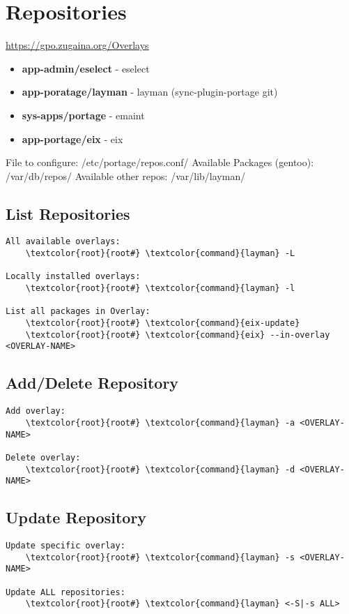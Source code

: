 \documentclass[10pt, a4paper, onecolumn, openany]{book}         %
\begin{document}
\section{Repositories}
\underline{\url{https://gpo.zugaina.org/Overlays}}\newline
\begin{itemize}
    \item \textbf{app-admin/eselect} - eselect
    \item \textbf{app-poratage/layman} - layman (sync-plugin-portage git)
    \item \textbf{sys-apps/portage} - emaint
    \item \textbf{app-portage/eix} - eix
\end{itemize}
File to configure: \textcolor{dir}{/etc/portage/repos.conf/}\newline
Available Packages (gentoo): \textcolor{dir}{/var/db/repos/}\newline
Available other repos: \textcolor{dir}{/var/lib/layman/}

\subsection{List Repositories}
\begin{Verbatim}[commandchars=\\\{\}]
All available overlays:
    \textcolor{root}{root#} \textcolor{command}{layman} -L
    
Locally installed overlays:
    \textcolor{root}{root#} \textcolor{command}{layman} -l
    
List all packages in Overlay:
    \textcolor{root}{root#} \textcolor{command}{eix-update}
    \textcolor{root}{root#} \textcolor{command}{eix} --in-overlay <OVERLAY-NAME>
\end{Verbatim}

\subsection{Add/Delete Repository}
\begin{Verbatim}[commandchars=\\\{\}]
Add overlay:
    \textcolor{root}{root#} \textcolor{command}{layman} -a <OVERLAY-NAME>
    
Delete overlay:
    \textcolor{root}{root#} \textcolor{command}{layman} -d <OVERLAY-NAME>
\end{Verbatim}

\subsection{Update Repository}
\begin{Verbatim}[commandchars=\\\{\}]
Update specific overlay:
    \textcolor{root}{root#} \textcolor{command}{layman} -s <OVERLAY-NAME>
    
Update ALL repositories:
    \textcolor{root}{root#} \textcolor{command}{layman} <-S|-s ALL>
\end{Verbatim} 
\end{document}
